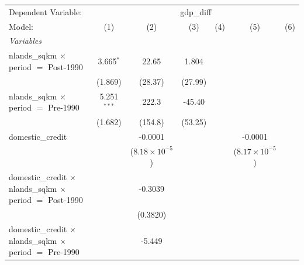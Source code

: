 \begingroup
\centering
\begin{tabular}{lcccccc}
   \tabularnewline \midrule \midrule
   Dependent Variable: & \multicolumn{6}{c}{gdp\_diff}\\
   Model:                                                                                          & (1)           & (2)                     & (3)             & (4)      & (5)                     & (6)\\  
   \midrule
   \emph{Variables}\\
   nlands\_sqkm $\times$ period $=$ Post-1990                                                      & 3.665$^{*}$   & 22.65                   & 1.804           &          &                         &   \\   
                                                                                                   & (1.869)       & (28.37)                 & (27.99)         &          &                         &   \\   
   nlands\_sqkm $\times$ period $=$ Pre-1990                                                       & 5.251$^{***}$ & 222.3                   & -45.40          &          &                         &   \\   
                                                                                                   & (1.682)       & (154.8)                 & (53.25)         &          &                         &   \\   
   domestic\_credit                                                                                &               & -0.0001                 &                 &          & -0.0001                 &   \\   
                                                                                                   &               & ($8.18\times 10^{-5}$)  &                 &          & ($8.17\times 10^{-5}$)  &   \\   
   domestic\_credit $\times$ nlands\_sqkm $\times$ period $=$ Post-1990                            &               & -0.3039                 &                 &          &                         &   \\   
                                                                                                   &               & (0.3820)                &                 &          &                         &   \\   
   domestic\_credit $\times$ nlands\_sqkm $\times$ period $=$ Pre-1990                             &               & -5.449                  &                 &          &                         &   \\   

\end{tabular}
